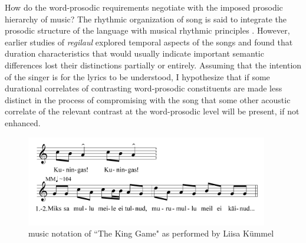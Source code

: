 How do the word-prosodic requirements negotiate with the imposed prosodic hierarchy of music? The rhythmic organization of song is said to integrate the prosodic structure of the language with musical rhythmic principles \citep{palmer1992}. However, earlier studies of {\it regilaul} explored temporal aspects of the songs and found that duration characteristics that would usually indicate important semantic differences lost their distinctions partially or entirely. Assuming that the intention of the singer is for the lyrics to be understood, I hypothesize that if some durational correlates of contrasting word-prosodic constituents are made less distinct in the process of compromising with the song that some other acoustic correlate of the relevant contrast at the word-prosodic level will be present, if not enhanced.  


\begin{figure}[htbp]
\begin{center}
\includegraphics[width=300pt]{figures/094.png}
\caption{music notation of ``The King Game" as performed by Liisa Kümmel}
\label{The King Game}
\end{center}
\end{figure}

%
%
%
%
%
%
%
%
%

